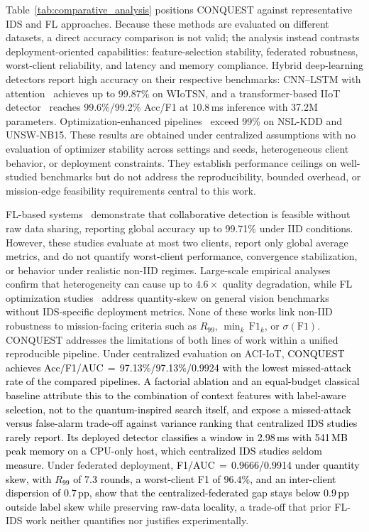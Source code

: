 \documentclass[conference]{IEEEtran}
\begin{document}
Table~\ref{tab:comparative_analysis} positions CONQUEST against
representative IDS and FL approaches. Because these methods are
evaluated on different datasets, a direct accuracy comparison is not
valid; the analysis instead contrasts deployment-oriented
capabilities: feature-selection stability, federated robustness,
worst-client reliability, and latency and memory compliance.
Hybrid deep-learning detectors report high accuracy on their
respective benchmarks: CNN--LSTM with
attention~\cite{phalaagaehybrid} achieves up to 99.87\% on
WIoTSN, and a transformer-based IIoT
detector~\cite{yuadaptive} reaches 99.6\%/99.2\% Acc/F1 at
10.8\,ms inference with 37.2M parameters.
Optimization-enhanced pipelines~\cite{donkoloptimization,shrivashybrid}
exceed 99\% on NSL-KDD and UNSW-NB15. These results are
obtained under centralized assumptions with no evaluation of
optimizer stability across settings and seeds, heterogeneous client behavior,
or deployment constraints. They establish performance
ceilings on well-studied benchmarks but do not address the
reproducibility, bounded overhead, or mission-edge feasibility
requirements central to this work.



FL-based systems~\cite{FRIHA202217,herlambangfederated}
demonstrate that \textcolor{black}{collaborative} detection is feasible
without raw data sharing, reporting global accuracy up to
99.71\% under IID conditions. However, these studies evaluate
at most two clients, report only global average metrics, and
do not quantify worst-client performance, convergence
stabilization, or behavior under realistic non-IID regimes.
Large-scale empirical analyses~\cite{abdelmoniemcomprehensive}
confirm that heterogeneity can cause up to $4.6\times$ quality
degradation, while FL optimization
studies~\cite{gefedamkd} address quantity-skew on general
vision benchmarks without IDS-specific deployment metrics.
None of these works link non-IID robustness to
mission-facing criteria such as $R_{99}$,
$\min_k\,\mathrm{F1}_k$, or $\sigma(\mathrm{F1})$.
CONQUEST addresses the limitations of both lines of work
within a unified reproducible pipeline. Under centralized
evaluation on ACI-IoT, \textcolor{black}{CONQUEST achieves
Acc/F1/AUC\,$=$\,97.13\%/97.13\%/0.9924 with the lowest
missed-attack rate of the compared pipelines. A factorial
ablation and an equal-budget classical baseline attribute this to
the combination of context features with label-aware selection,
not to the quantum-inspired search itself, and expose a
missed-attack versus false-alarm trade-off against variance
ranking that centralized IDS studies rarely report.}
\textcolor{black}{Its deployed detector classifies a window in
2.98\,ms with 541\,MB peak memory on a CPU-only host, which
centralized IDS studies seldom measure.}
Under federated deployment,
\textcolor{black}{F1/AUC\,$=$\,0.9666/0.9914 under quantity skew, with
$R_{99}$ of 7.3 rounds, a worst-client F1 of $96.4\%$, and an
inter-client dispersion of $0.7$\,pp, show that the
centralized-federated gap stays below 0.9\,pp outside label skew}
while preserving \textcolor{black}{raw-data locality}, a trade-off that
prior FL-IDS work neither quantifies nor justifies
experimentally.
\end{document}
